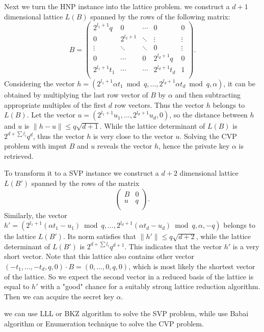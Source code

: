 Next we turn the HNP instance into the lattice problem.
we construct a $d+1$ dimensional lattice $L(B)$ spanned by the rows of the following matrix:
$$B =
\left(
  \begin{array}{ccccc}
    2^{l_1+1}q & 0 & \cdots & 0 & 0 \\
    0 & 2^{l_2+1} & \ddots & \vdots & \vdots \\
    \vdots & \ddots & \ddots & 0 & \vdots \\
    0 & \cdots & 0 & 2^{l_d+1}q & 0 \\
    2^{l_1+1}t_1 & \cdots & \cdots & 2^{l_d+1}t_d & 1 \\
  \end{array}
\right).
$$
Considering the vector $h = (2^{l_1+1}\alpha t_1 \bmod q, ..., 2^{l_d+1}\alpha t_d \bmod q, \alpha)$,
 it can be obtained by multiplying the last row vector of $B$ by $\alpha$ and then subtracting appropriate multiples of the first $d$ row vectors.
Thus the vector $h$ belongs to $L(B)$.
Let the vector $u = (2^{l_1+1}u_1, ..., 2^{l_d+1}u_d, 0)$,
 so the distance between $h$ and $u$ is $\|h - u\| \leq q\sqrt{d+1}$.
While the lattice determinant of $L(B)$ is $2^{d + \sum{l_i}}q^d$,
 thus the vector $h$ is very close to the vector $u$.
Solving the CVP problem with imput $B$ and $u$ reveals the vector $h$,
 hence the private key $\alpha$ is retrieved.

To transform it to a SVP instance we construct a $d+2$ dimensional lattice $L(B')$ spanned by the rows of the matrix
$$
\left(
  \begin{array}{cc}
    B & 0 \\
    u & q \\
  \end{array}
\right).
$$
Similarly, the vector $h' = (2^{l_1+1}(\alpha t_1 - u_1) \bmod q, ..., 2^{l_d+1}(\alpha t_d - u_d) \bmod q, \alpha, -q)$ belongs to the lattice $L(B')$.
 Its norm satisfies that $\|h'\| \leq q\sqrt{d+2}$,
  while the lattice determinant of $L(B')$ is $2^{d + \sum{l_i}}q^{d+1}$.
   This indicates that the vector $h'$ is a very short vector.
Note that this lattice also contains other vector $(-t_1, ..., -t_d, q, 0)\cdot B = (0, ..., 0, q, 0)$,
 which is most likely the shortest vector of the lattice.
So we expect the second vector in a reduced basis of the lattice is equal to $h'$ with a "good" chance for a suitably strong lattice reduction algorithm.
Then we can acquire the secret key $\alpha$.

we can use LLL or BKZ algorithm to solve the SVP problem, while use Babai algorithm or Enumeration technique to solve the CVP problem.

























